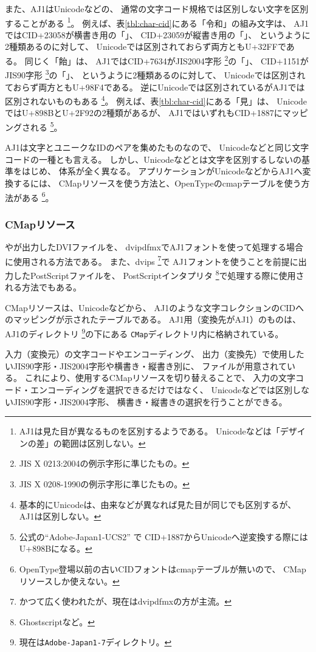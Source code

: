 また、AJ1はUnicodeなどの、
通常の文字コード規格では区別しない文字を区別することがある
\footnote{AJ1は見た目が異なるものを区別するようである。
  Unicodeなどは「デザインの差」の範囲は区別しない。}。
例えば、表\ref{tbl:char-cid}にある「令和」の組み文字は、
AJ1ではCID+23058が横書き用の「{\gtfamily {}}」、
CID+23059が縦書き用の「{\gtfamily {}}」、
というように2種類あるのに対して、
Unicodeでは区別されておらず両方ともU+32FFである。
同じく「飴」は、
AJ1ではCID+7634がJIS2004字形
\footnote{JIS X 0213:2004の例示字形に準じたもの。}の「」、
CID+1151がJIS90字形
\footnote{JIS X 0208-1990の例示字形に準じたもの。}の「」、
というように2種類あるのに対して、
Unicodeでは区別されておらず両方ともU+98F4である。
逆にUnicodeでは区別されているがAJ1では区別されないものもある
\footnote{基本的にUnicodeは、由来などが異なれば見た目が同じでも区別するが、
  AJ1は区別しない。}。
例えば、表\ref{tbl:char-cid}にある「見」は、
UnicodeではU+898BとU+2F92の2種類があるが、
AJ1ではいずれもCID+1887にマッピングされる
\footnote{公式の``Adobe-Japan1-UCS2'' \cite{mapping-resources}で
  CID+1887からUnicodeへ逆変換する際にはU+898Bになる。}。

AJ1は文字とユニークなIDのペアを集めたものなので、
Unicodeなどと同じ文字コードの一種とも言える。
しかし、Unicodeなどとは文字を区別するしないの基準をはじめ、
体系が全く異なる。
アプリケーションがUnicodeなどからAJ1へ変換するには、
CMapリソースを使う方法と、OpenTypeのcmapテーブルを使う方法がある
\footnote{OpenType登場以前の古いCIDフォントはcmapテーブルが無いので、
  CMapリソースしか使えない。}。

\subsubsection{CMapリソース}

\pTeX や\upTeX が出力したDVIファイルを、
dvipdfmxでAJ1フォントを使って処理する場合に使用される方法である。
また、dvips \footnote{かつて広く使われたが、現在はdvipdfmxの方が主流。}で
AJ1フォントを使うことを前提に出力したPostScriptファイルを、
PostScriptインタプリタ
\footnote{Ghostscriptなど。}で処理する際に使用される方法でもある。

CMapリソース\cite{cmap-resource}は、Unicodeなどから、
AJ1のような文字コレクションのCIDへのマッピングが示されたテーブルである。
AJ1用（変換先がAJ1）のものは、AJ1のディレクトリ
\footnote{現在は\texttt{Adobe-Japan1-7}ディレクトリ。}の下にある
\texttt{CMap}ディレクトリ内に格納されている。

入力（変換元）の文字コードやエンコーディング、
出力（変換先）で使用したいJIS90字形・JIS2004字形や横書き・縦書き別に、
ファイルが用意されている。
これにより、使用するCMapリソースを切り替えることで、
入力の文字コード・エンコーディングを選択できるだけではなく、
Unicodeなどでは区別しないJIS90字形・JIS2004字形、
横書き・縦書きの選択を行うことができる。


